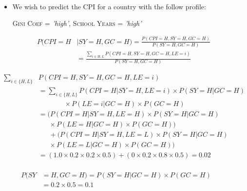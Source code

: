 \documentclass[xcolor={table}]{beamer}
\newcommand{\featN}[1]{\textsc{#1}}
\newcommand{\featL}[1]{\textit{'#1'}}
\begin{document}
\begin{frame}
	\begin{example}
		\begin{itemize}
		\item We wish to predict the \featN{CPI} for a country with the follow profile:
		\begin{center}
			\featN{Gini Coef} = \featL{high}, \featN{School Years} = \featL{high}
		\end{center}
		\end{itemize}
	\end{example}
\end{frame}

 \begin{frame} 
\begin{align*}
P(CPI=H&|SY=H,GC=H) = \frac{P(CPI=H,SY=H,GC=H)}{P(SY=H,GC=H)}\\
&= \frac{\displaystyle\sum_{i \in H,L} P(CPI=H,SY=H,GC=H,LE=i)}{P(SY=H,GC=H)}
\end{align*}
\end{frame} 



 \begin{frame} 
\begin{align*}
\sum_{i \in \{H,L\}}&P(CPI=H,SY=H,GC=H,LE=i)\\
&=\sum_{i \in \{H,L\}}P(CPI=H|SY=H,LE=i)\times P(SY=H|GC=H)\\
&~~~~~~~~~~~~~~~~~\times P(LE=i|GC=H) \times P(GC=H)\\
&= (P(CPI=H|SY=H,LE=H)\times P(SY=H|GC=H)\\
&~~~~~~~\times P(LE=H|GC=H) \times P(GC=H))\\
&~~~~~~~+ (P(CPI=H|SY=H,LE=L)\times P(SY=H|GC=H)\\
&~~~~~~~\times P(LE=L|GC=H) \times P(GC=H))\\
&= (1.0 \times 0.2 \times 0.2 \times 0.5) + (0 \times 0.2 \times 0.8 \times 0.5) =0.02\\
\end{align*}
\end{frame} 



 \begin{frame} 
\begin{align*}
P(SY&=H,GC=H)=P(SY=H|GC=H)\times P(GC=H)~~~~~~~~~~\\
&=0.2 \times 0.5 =0.1\\
\end{align*}
\end{frame} 
\end{document}
